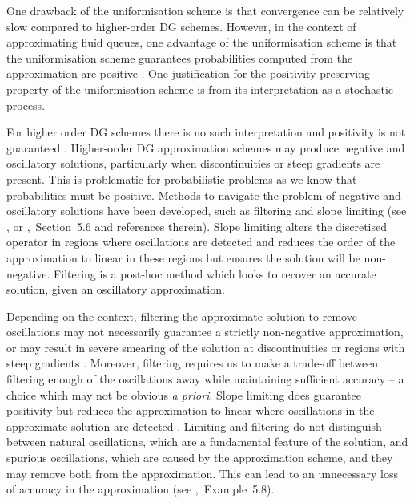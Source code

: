 One drawback of the uniformisation scheme is that convergence can be relatively slow compared to higher-order DG schemes. However, in the context of approximating fluid queues, one advantage of the uniformisation scheme is that the uniformisation scheme guarantees probabilities computed from the approximation are positive \citep[Section~3.3]{koltai2011}. One justification for the positivity preserving property of the uniformisation scheme is from its interpretation as a stochastic process. 

For higher order DG schemes there is no such interpretation and positivity is not guaranteed \citep[Section~3.3]{koltai2011}. Higher-order DG approximation schemes may produce negative and oscillatory solutions, particularly when discontinuities or steep gradients are present. This is problematic for probabilistic problems as we know that probabilities must be positive. Methods to navigate the problem of negative and oscillatory solutions have been developed, such as filtering and slope limiting (see \cite{c99}, or \cite{nodalDGBook},~Section~5.6 and references therein). Slope limiting alters the discretised operator in regions where oscillations are detected and reduces the order of the approximation to linear in these regions but ensures the solution will be non-negative. Filtering is a post-hoc method which looks to recover an accurate solution, given an oscillatory approximation. 

Depending on the context, filtering the approximate solution to remove oscillations may not necessarily guarantee a strictly non-negative approximation, or may result in severe smearing of the solution at discontinuities or regions with steep gradients \citep[Section~5.6.1]{nodalDGBook}. Moreover, filtering requires us to make a trade-off between filtering enough of the oscillations away while maintaining sufficient accuracy -- a choice which may not be obvious \emph{a priori}. Slope limiting does guarantee positivity but reduces the approximation to linear where oscillations in the approximate solution are detected \citep[Section~5.6.1]{nodalDGBook}. Limiting and filtering do not distinguish between natural oscillations, which are a fundamental feature of the solution, and spurious oscillations, which are caused by the approximation scheme, and they may remove both from the approximation. This can lead to an unnecessary loss of accuracy in the approximation (see \citep{nodalDGBook},~Example~5.8). 

